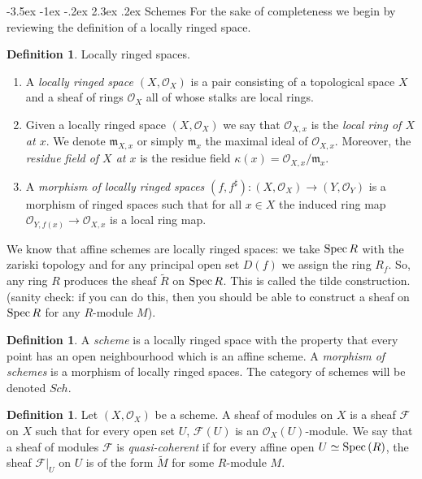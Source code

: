 \documentclass[11pt]{amsart}
\makeatletter
\renewcommand\section{\@startsection {section}{1}{\z@}%
	{-3.5ex \@plus -1ex \@minus -.2ex}%
	{2.3ex \@plus.2ex}%
	{\normalfont\scshape\center}}
\newcommand{\Spec}{{\rm Spec \,}}
\renewcommand{\tilde}{\widetilde}
\theoremstyle{definition}
\newtheorem{definition}[theorem]{Definition}
\makeatother
\begin{document}
\section{Schemes}
For the sake of completeness we begin by reviewing the definition of a locally ringed space.

\begin{definition}
	\label{definition-locally-ringed-space}
	Locally ringed spaces.
	\begin{enumerate}
		\item A {\it locally ringed space $(X, \mathcal{O}_X)$}
		is a pair consisting of a
		topological space $X$ and a sheaf of rings $\mathcal{O}_X$ all of whose stalks
		are local rings.
		\item Given a locally ringed space $(X, \mathcal{O}_X)$ we say that
		$\mathcal{O}_{X, x}$ is the {\it local ring of $X$ at $x$}.
		We denote $\mathfrak{m}_{X, x}$ or simply $\mathfrak{m}_x$
		the maximal ideal of $\mathcal{O}_{X, x}$. Moreover, the
		{\it residue field of $X$ at $x$} is the residue field
		$\kappa(x) = \mathcal{O}_{X, x}/\mathfrak{m}_x$.
		\item A {\it morphism of locally ringed spaces}
		$(f, f^\sharp) : (X, \mathcal{O}_X) \to (Y, \mathcal{O}_Y)$
		is a morphism of ringed spaces such that for all $x \in X$
		the induced ring map $\mathcal{O}_{Y, f(x)} \to \mathcal{O}_{X, x}$ is a
		local ring map.
	\end{enumerate}
\end{definition}


We know that affine schemes are locally ringed spaces: we take $\Spec R$ with the zariski topology and for any principal open set $D(f)$ we assign the ring $R_f$. So, any ring $R$ produces the sheaf $\tilde{R}$ on $\Spec R$. This is called the tilde construction. (sanity check: if you can do this, then you should be able to construct a sheaf on $\Spec R$ for any $R$-module $M$).


\begin{definition}
	\label{definition-scheme}
	A {\it scheme} is a locally ringed space with the property that
	every point has an open neighbourhood which is an affine scheme.
	A {\it morphism of schemes} is a morphism of locally
	ringed spaces. The category of schemes will be denoted
	$Sch$.
\end{definition}

\begin{definition}
	\label{definition-quasi-coherent-sheaf}
	Let $(X,\mathcal{O}_X)$ be a scheme. A sheaf of modules on $X$ is a sheaf $\mathcal{F}$ on $X$ such that for every open set $U$, $\mathcal{F}(U)$ is an $\mathcal{O}_X(U)$-module. We say that a sheaf of modules $\mathcal{F}$ is \textit{quasi-coherent} if for every affine open $U\simeq \Spec(R)$, the sheaf $\mathcal{F}|_U$ on $U$ is of the form $\tilde{M}$ for some $R$-module $M$.
\end{definition}
\end{document}
